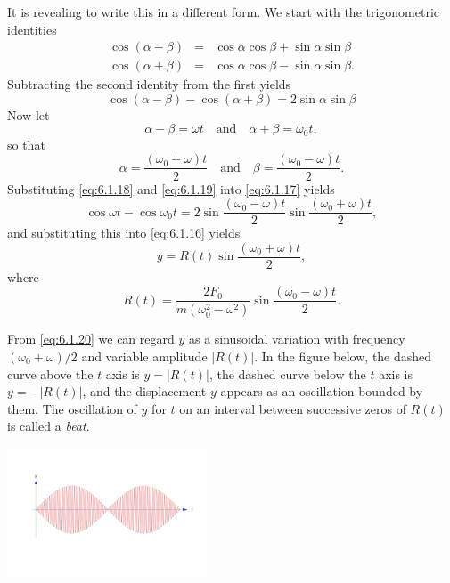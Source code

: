 \documentclass{ximera}
\begin{document}
\begin{example}
\begin{explanation}
It is revealing to write this in a different form.  We start with the
trigonometric identities
\begin{eqnarray*}
\cos(\alpha-\beta)&=&\cos\alpha\cos\beta+\sin\alpha\sin\beta\\
\cos(\alpha+\beta)&=&\cos\alpha\cos\beta-\sin\alpha\sin\beta.
\end{eqnarray*}
Subtracting the second identity from the first yields
\begin{equation}\label{eq:6.1.17}
\cos(\alpha-\beta)-\cos(\alpha+\beta)=2\sin\alpha\sin\beta
\end{equation}
 Now let
\begin{equation}\label{eq:6.1.18}
\alpha-\beta=\omega t\quad\mbox{and}\quad\alpha+\beta=\omega_0t,
\end{equation}
 so that
\begin{equation}\label{eq:6.1.19}
\alpha=\frac{(\omega_0+\omega)t}{2}\quad\mbox{and}\quad\beta=\frac{(\omega_0-\omega
)t}{2}.
\end{equation}
 Substituting \eqref{eq:6.1.18} and \eqref{eq:6.1.19} into \eqref{eq:6.1.17}
yields
 $$
\cos\omega t-\cos\omega_0t=
2\sin\frac{(\omega_0-\omega)t}{2}\sin\frac{(\omega_0+\omega)t}{2},
$$
and substituting this into \eqref{eq:6.1.16} yields
\begin{equation}\label{eq:6.1.20}
y=R(t)\sin\frac{(\omega_0+\omega)t}{2},
\end{equation}
 where
\begin{equation}\label{eq:6.1.21}
R(t)=\frac{2F_0}{m(\omega_0^2-\omega^2)}
\sin\frac{(\omega_0-\omega)t}{2}.
\end{equation}
 
From \eqref{eq:6.1.20} we can regard $y$ as a sinusoidal variation with
frequency $(\omega_0+\omega)/2$ and variable amplitude
$|R(t)|$. In the figure below, the dashed curve above the $t$ axis
is $y=|R(t)|$, the dashed curve below the $t$ axis is $y=-|R(t)|$, and
the displacement $y$ appears as an oscillation bounded by them. The
oscillation of $y$ for $t$ on an interval between successive zeros of
$R(t)$ is called a \textit{beat}.
 
 
 
\begin{image}
  \includegraphics[height=1.5in]{fig060106.jpg}
\end{image}
 

\end{explanation}
\end{example}
\end{document}
